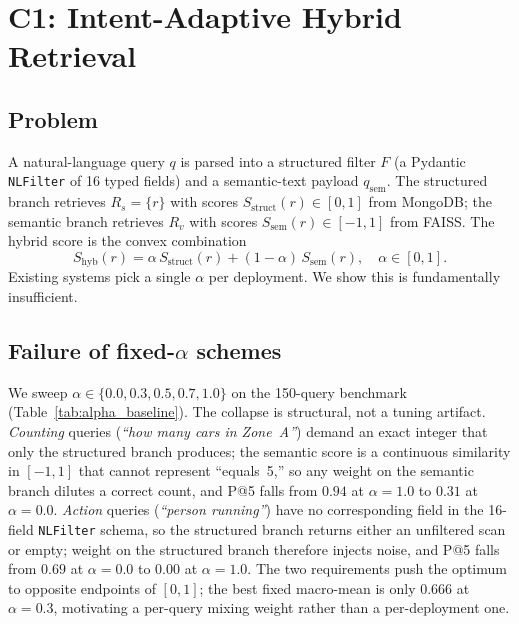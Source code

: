 ﻿\documentclass[conference]{IEEEtran}
\theoremstyle{definition}
\begin{document}
\section{C1: Intent-Adaptive Hybrid Retrieval}\label{sec:adaptive_alpha}

\subsection{Problem}
A natural-language query $q$ is parsed into a structured filter $F$ (a Pydantic \texttt{NLFilter} of 16 typed fields) and a semantic-text payload $q_{\text{sem}}$. The structured branch retrieves $R_s = \{r\}$ with scores $S_{\text{struct}}(r)\in[0,1]$ from MongoDB; the semantic branch retrieves $R_v$ with scores $S_{\text{sem}}(r)\in[-1,1]$ from FAISS. The hybrid score is the convex combination
\begin{equation}
S_{\text{hyb}}(r) = \alpha\, S_{\text{struct}}(r) + (1-\alpha)\, S_{\text{sem}}(r),\quad \alpha\in[0,1].
\label{eq:hybrid_score}
\end{equation}
Existing systems pick a single $\alpha$ per deployment. We show this is fundamentally insufficient.

\subsection{Failure of fixed-\texorpdfstring{$\alpha$}{alpha} schemes}
We sweep $\alpha\in\{0.0, 0.3, 0.5, 0.7, 1.0\}$ on the 150-query benchmark (Table~\ref{tab:alpha_baseline}). The collapse is structural, not a tuning artifact. \emph{Counting} queries (\textit{``how many cars in Zone~A''}) demand an exact integer that only the structured branch produces; the semantic score is a continuous similarity in $[-1,1]$ that cannot represent ``equals~5,'' so any weight on the semantic branch dilutes a correct count, and P@5 falls from $0.94$ at $\alpha{=}1.0$ to $0.31$ at $\alpha{=}0.0$. \emph{Action} queries (\textit{``person running''}) have no corresponding field in the 16-field \texttt{NLFilter} schema, so the structured branch returns either an unfiltered scan or empty; weight on the structured branch therefore injects noise, and P@5 falls from $0.69$ at $\alpha{=}0.0$ to $0.00$ at $\alpha{=}1.0$. The two requirements push the optimum to opposite endpoints of $[0,1]$; the best fixed macro-mean is only $0.666$ at $\alpha{=}0.3$, motivating a per-query mixing weight rather than a per-deployment one.
\end{document}
